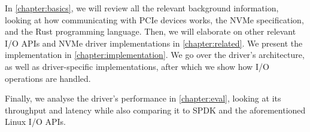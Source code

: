 In \autoref{chapter:basics}, we will review all the relevant background information, looking at how communicating with PCIe devices works, the NVMe specification, and the Rust programming language. Then, we will elaborate on other relevant I/O APIs and NVMe driver implementations in \autoref{chapter:related}.
We present the implementation in \autoref{chapter:implementation}. We go over the driver's architecture, as well as driver-specific implementations, after which we show how I/O operations are handled.

Finally, we analyse the driver's performance in \autoref{chapter:eval}, looking at its throughput and latency while also comparing it to SPDK and the aforementioned Linux I/O APIs.
